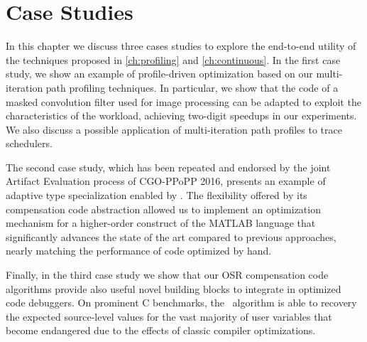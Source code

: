 \chapter{Case Studies}
\label{ch:case-studies}

In this chapter we discuss three cases studies to explore the end-to-end utility of the techniques proposed in \mychapter\ref{ch:profiling} and \mychapter\ref{ch:continuous}. In the first case study, we show an example of profile-driven optimization based on our multi-iteration path profiling techniques. In particular, we show that the code of a masked convolution filter used for image processing can be adapted to exploit the characteristics of the workload, achieving two-digit speedups in our experiments. We also discuss a possible application of multi-iteration path profiles to trace schedulers.

The second case study, which has been repeated and endorsed by the joint Artifact Evaluation process of CGO-PPoPP 2016, presents an example of adaptive type specialization enabled by \osrkit. The flexibility offered by its compensation code abstraction allowed us to implement an optimization mechanism for a higher-order construct of the MATLAB language that significantly advances the state of the art compared to previous approaches, nearly matching the performance of code optimized by hand.


Finally, in the third case study we show that our OSR compensation code algorithms provide also useful novel building blocks to integrate in optimized code debuggers. On prominent C benchmarks, the \reconstruct\ algorithm is able to recovery the expected source-level values for the vast majority of user variables that become endangered due to the effects of classic compiler optimizations.




